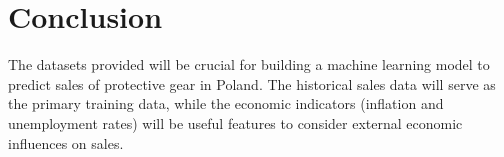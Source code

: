 \documentclass{article}
\begin{document}
\section{Conclusion}
The datasets provided will be crucial for building a machine learning model to predict sales of protective gear in Poland. The historical sales data will serve as the primary training data, while the economic indicators (inflation and unemployment rates) will be useful features to consider external economic influences on sales.
\end{document}
